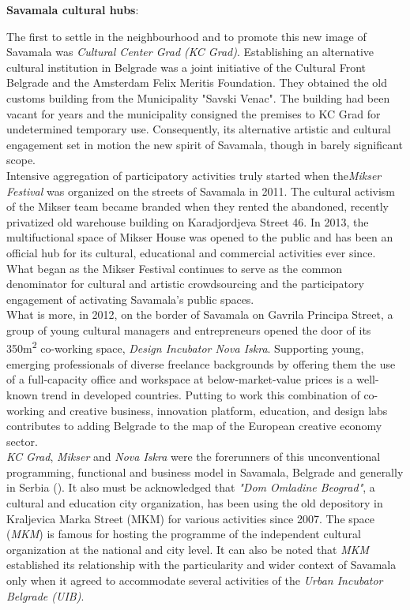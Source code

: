 \documentclass[11pt]{report}
\begin{document}
\textbf{Savamala cultural hubs}: 

The first to settle in the neighbourhood and to promote this new image of Savamala was \textit{Cultural Center Grad (KC Grad)}. Establishing an alternative cultural institution in Belgrade was a joint initiative of the Cultural Front Belgrade and the Amsterdam Felix Meritis Foundation.
They obtained the old customs building from the Municipality "Savski Venac".
The building had been vacant for years and the municipality consigned the premises to KC Grad for undetermined temporary use. Consequently, its alternative artistic and cultural engagement set in motion the new spirit of Savamala, though in barely significant scope.
\\

Intensive aggregation of participatory activities truly started when the\textit{Mikser Festival} was organized on the streets of Savamala in 2011. The cultural activism of the Mikser team became branded when they rented the abandoned, recently privatized old warehouse building on Karadjordjeva Street 46. In 2013, the multifuctional space of Mikser House was opened to the public and has been an official hub for its cultural, educational and commercial activities ever since. What began as the Mikser Festival continues to serve as the common denominator for cultural and artistic crowdsourcing and the participatory engagement of activating Savamala’s public spaces.
\\
What is more, in 2012, on the border of Savamala on Gavrila Principa Street, a group of young cultural managers and entrepreneurs opened the door of its 350m\textsuperscript{2} co-working space, \textit{Design Incubator Nova Iskra}. Supporting young, emerging professionals of diverse freelance backgrounds by offering them the use of a full-capacity office and workspace at below-market-value prices is a well-known trend in  developed countries. 
Putting to work this combination of co-working and creative business, innovation platform, education, and design labs contributes to adding Belgrade to the map of the European creative economy sector. 
\\

\textit{KC Grad}, \textit{Mikser} and \textit{Nova Iskra} were the forerunners of this unconventional programming, functional and business model in Savamala, Belgrade and generally in Serbia (\href{Doytchinov}{\citealt{doytchinov_urban_2015}}). %
It also must be acknowledged that \textit{"Dom Omladine Beograd"}, a cultural and education city organization, has been using the old depository in Kraljevica Marka Street (MKM) for various activities since 2007.
The space (\textit{MKM}) is famous for hosting the programme of the independent cultural organization at the national and city level.
It can also be noted that \textit{MKM} established its relationship with the particularity and wider context of Savamala only when it agreed to accommodate several activities of the \textit{Urban Incubator Belgrade (UIB)}.
\\
\end{document}
